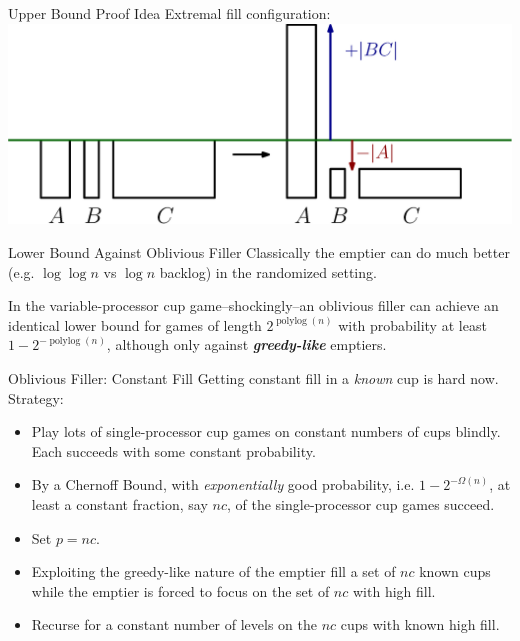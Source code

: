 \documentclass[xcolor=x11names, svgnames, rgb]{beamer}
\newcommand{\polylog}{\operatorname{polylog}}
\newcommand{\defn}[1]       {{\textit{\textbf{\boldmath #1}}}}
\begin{document}
\begin{frame}[t]{Upper Bound Proof Idea}
  Extremal fill configuration:
  \vspace{0.5cm}
  \includegraphics[width=\linewidth]{upperbound/upperboundpf.eps}
\end{frame}

\begin{frame}[t]{Lower Bound Against Oblivious Filler}
  Classically the emptier can do much better (e.g. $\log\log n$ vs $\log n$
  backlog) in the randomized setting.

  \vspace{0.5cm}

  In the variable-processor cup game--shockingly--an oblivious filler can
  achieve an identical lower bound for games of length $2^{\polylog(n)}$ 
  with probability at least $1-2^{-\polylog(n)}$, although only against \defn{greedy-like} emptiers.
\end{frame}

\begin{frame}[t]{Oblivious Filler: Constant Fill}
  Getting constant fill in a \emph{known} cup is hard now. Strategy:
  \begin{itemize}
    \item Play lots of single-processor cup games on constant numbers of cups
      blindly. Each succeeds with some constant probability.
    \item By a Chernoff Bound, with \emph{exponentially} good probability, i.e.
      $1-2^{-\Omega(n)}$, at least a constant fraction, say $nc$, of the single-processor
      cup games succeed.
    \item Set $p=nc$.
    \item Exploiting the greedy-like nature of the emptier fill a set of $nc$
      known cups while the emptier is forced to focus on the set of $nc$ with
      high fill.
    \item Recurse for a constant number of levels on the $nc$ cups with known high fill. 
  \end{itemize}
\end{frame}
\end{document}
